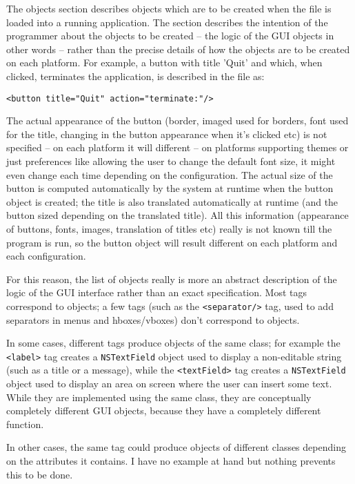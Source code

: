 The objects section describes objects which are to be created when the
file is loaded into a running application.  The section describes the
intention of the programmer about the objects to be created -- the
logic of the GUI objects in other words -- rather than the precise
details of how the objects are to be created on each platform.  For
example, a button with title 'Quit' and which, when clicked,
terminates the application, is described in the file as:
\begin{verbatim}
<button title="Quit" action="terminate:"/>
\end{verbatim}
The actual appearance of the button (border, imaged used for borders,
font used for the title, changing in the button appearance when it's
clicked etc) is not specified -- on each platform it will different --
on platforms supporting themes or just preferences like allowing the
user to change the default font size, it might even change each time
depending on the configuration.  The actual size of the button is
computed automatically by the system at runtime when the button object
is created; the title is also translated automatically at runtime (and
the button sized depending on the translated title).  All this
information (appearance of buttons, fonts, images, translation of
titles etc) really is not known till the program is run, so the button
object will result different on each platform and each configuration.

For this reason, the list of objects really is more an abstract
description of the logic of the GUI interface rather than an exact
specification.  Most tags correspond to objects; a few tags (such as
the \texttt{<separator/>} tag, used to add separators in menus and
hboxes/vboxes) don't correspond to objects.

In some cases, different tags produce objects of the same class; for
example the \texttt{<label>} tag creates a \texttt{NSTextField} object
used to display a non-editable string (such as a title or a message),
while the \texttt{<textField>} tag creates a \texttt{NSTextField}
object used to display an area on screen where the user can insert
some text.  While they are implemented using the same class, they are
conceptually completely different GUI objects, because they have a
completely different function.

In other cases, the same tag could produce objects of different
classes depending on the attributes it contains.  I have no example at
hand but nothing prevents this to be done.

